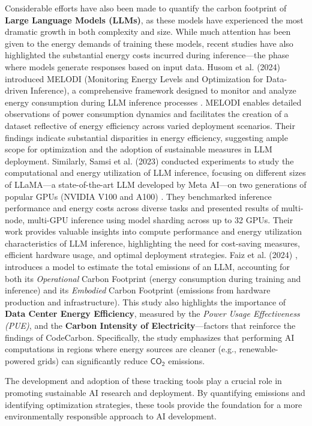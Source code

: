 \documentclass[a4paper,singleside,12pt]{report} %
\begin{document}
Considerable efforts have also been made to quantify the carbon footprint of \textbf{Large Language Models (LLMs)}, as these 
models have experienced the most dramatic growth in both complexity and size. While much attention has been given to the energy 
demands of training these models, recent studies have also highlighted the substantial energy costs incurred during inference—the 
phase where models generate responses based on input data. Husom et al. (2024) introduced MELODI (Monitoring Energy Levels and 
Optimization for Data-driven Inference), a comprehensive framework designed to monitor and analyze energy consumption during LLM 
inference processes \cite{husom2024priceprompting}. MELODI enables detailed observations of power consumption dynamics and 
facilitates the creation of a dataset reflective of energy efficiency across varied deployment scenarios. Their findings indicate 
substantial disparities in energy efficiency, suggesting ample scope for optimization and the adoption of sustainable measures 
in LLM deployment. Similarly, Samsi et al. (2023) conducted experiments to study the computational and energy utilization of 
LLM inference, focusing on different sizes of LLaMA—a state-of-the-art LLM developed by Meta AI—on two generations of popular 
GPUs (NVIDIA V100 and A100) \cite{samsi2023wordswattsbenchmarkingenergy}. They benchmarked inference performance and energy 
costs across diverse tasks and presented results of multi-node, multi-GPU inference using model sharding across up to 32 GPUs. 
Their work provides valuable insights into compute performance and energy utilization characteristics of LLM inference, 
highlighting the need for cost-saving measures, efficient hardware usage, and optimal deployment strategies. Faiz et al. (2024) 
\cite{faiz2024llmcarbon}, introduces a model to estimate the total emissions of an LLM, accounting for both its \textit{Operational} 
Carbon Footprint (energy consumption during training and inference) and its \textit{Embodied} Carbon Footprint (emissions from 
hardware production and infrastructure). This study also highlights the importance of \textbf{Data Center Energy Efficiency}, 
measured by the \textit{Power Usage Effectiveness (PUE)}, and the \textbf{Carbon Intensity of Electricity}—factors that reinforce 
the findings of CodeCarbon. Specifically, the study emphasizes that performing AI computations in regions where energy sources 
are cleaner (e.g., renewable-powered grids) can significantly reduce $\mathsf{CO_2}$ emissions. 

The development and adoption of these tracking tools play a crucial role in promoting sustainable AI research and deployment. 
By quantifying emissions and identifying optimization strategies, these tools provide the foundation for a more environmentally 
responsible approach to AI development.
\end{document}
